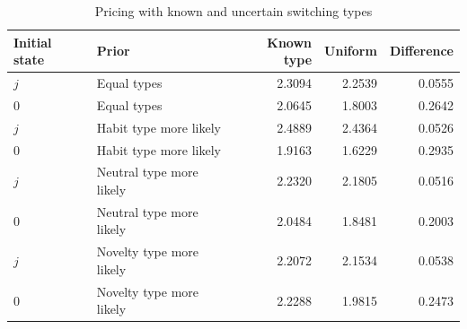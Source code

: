 \begin{table}[htbp]\centering\small
\caption{Pricing with known and uncertain switching types}
\label{tab:gamma-uncertainty}
\begin{tabular}{llrrr}\toprule
Initial state & Prior & Known type & Uniform & Difference\\\midrule
$j$ & Equal types & 2.3094 & 2.2539 & 0.0555 \\
$0$ & Equal types & 2.0645 & 1.8003 & 0.2642 \\
$j$ & Habit type more likely & 2.4889 & 2.4364 & 0.0526 \\
$0$ & Habit type more likely & 1.9163 & 1.6229 & 0.2935 \\
$j$ & Neutral type more likely & 2.2320 & 2.1805 & 0.0516 \\
$0$ & Neutral type more likely & 2.0484 & 1.8481 & 0.2003 \\
$j$ & Novelty type more likely & 2.2072 & 2.1534 & 0.0538 \\
$0$ & Novelty type more likely & 2.2288 & 1.9815 & 0.2473 \\
\bottomrule\end{tabular}
\end{table}
